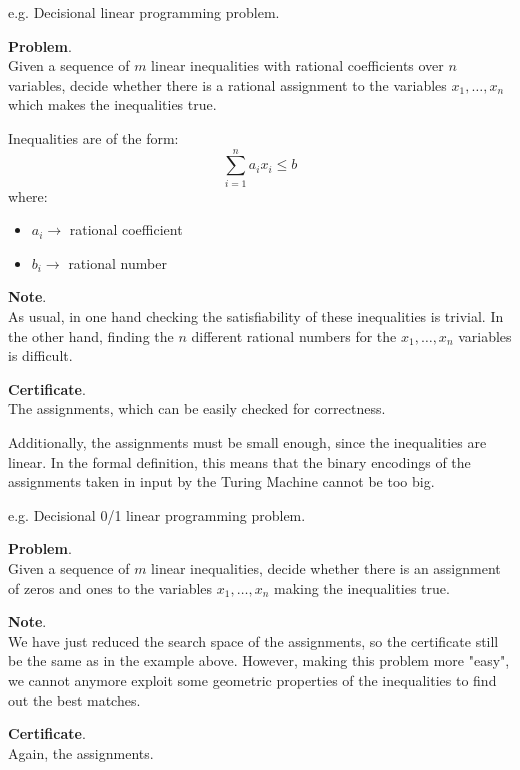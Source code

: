 \begin{example}[title = Decisional Linear Programming]
    e.g. Decisional linear programming problem. \vspace{7pt}

    \textbf{Problem}. \\
    Given a sequence of $m$ linear inequalities with rational coefficients over $n$ variables, decide whether there is a rational assignment to the variables 
    $x_1, \dots, x_n$ which makes the inequalities true. \vspace{7pt}

    Inequalities are of the form:
    $$\sum_{i = 1}^{n} a_i x_i \leq b$$
    where:
    \begin{itemize}
        \renewcommand{\labelitemi}{-}
        \item $a_i \rightarrow$ rational coefficient
        \item $b_i \rightarrow$ rational number
    \end{itemize} \vspace{7pt}

    \textbf{Note}. \\
    As usual, in one hand checking the satisfiability of these inequalities is trivial. In the other hand, finding the $n$ different rational numbers for the 
    $x_1, \dots, x_n$ variables is difficult. \vspace{7pt}

    \textbf{Certificate}. \\
    The assignments, which can be easily checked for correctness. \vspace{7pt}

    Additionally, the assignments must be small enough, since the inequalities are linear. In the formal definition, this means that the binary encodings of the
    assignments taken in input by the Turing Machine cannot be too big.
\end{example}
\begin{example}[title = Decisional 0/1 Linear Programming]
    e.g. Decisional 0/1 linear programming problem. \vspace{7pt}

    \textbf{Problem}. \\
    Given a sequence of $m$ linear inequalities, decide whether there is an assignment of zeros and ones to the variables $x_1, \dots, x_n$ making the 
    inequalities true. \vspace{7pt}

    \textbf{Note}. \\
    We have just reduced the search space of the assignments, so the certificate still be the same as in the example above. However, making this problem 
    more "easy", we cannot anymore exploit some geometric properties of the inequalities to find out the best matches. \vspace{7pt}

    \textbf{Certificate}. \\
    Again, the assignments. 
\end{example}
